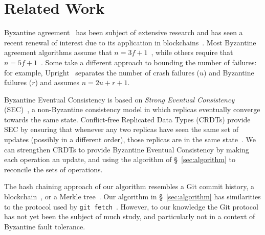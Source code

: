 \documentclass[manuscript,anonymous]{acmart}
\begin{document}
\section{Related Work}

Byzantine agreement~\cite{Lamport:1982} has been subject of extensive research and has seen a recent renewal of interest due to its application in blockchains~\cite{Bano:2019}.
Most Byzantine agreement algorithms assume that $n=3f+1$~\cite{Castro:1999,Cowling:2006,Kotla:2007,Aublin:2015,Yin:2019}, while others require that $n=5f+1$~\cite{Abd:2005,Martin:2006}.
Some take a different approach to bounding the number of failures: for example, Upright~\cite{Clement:2009} separates the number of crash failures ($u$) and Byzantine failures ($r$) and assumes $n=2u+r+1$.


Byzantine Eventual Consistency is based on \emph{Strong Eventual Consistency} (SEC)~\cite{Shapiro:2011un}, a non-Byzantine consistency model in which replicas eventually converge towards the same state.
Conflict-free Replicated Data Types (CRDTs) provide SEC by ensuring that whenever any two replicas have seen the same set of updates (possibly in a different order), those replicas are in the same state~\cite{Shapiro:2011un}.
We can strengthen CRDTs to provide Byzantine Eventual Consistency by making each operation an update, and using the algorithm of \S~\ref{sec:algorithm} to reconcile the sets of operations.

The hash chaining approach of our algorithm resembles a Git commit history, a blockchain~\cite{Bano:2019}, or a Merkle tree~\cite{Merkle:1987}.
Our algorithm in \S~\ref{sec:algorithm} has similarities to the protocol used by \texttt{git fetch}~\cite{GitHTTP}.
However, to our knowledge the Git protocol has not yet been the subject of much study, and particularly not in a context of Byzantine fault tolerance.


\end{document}
